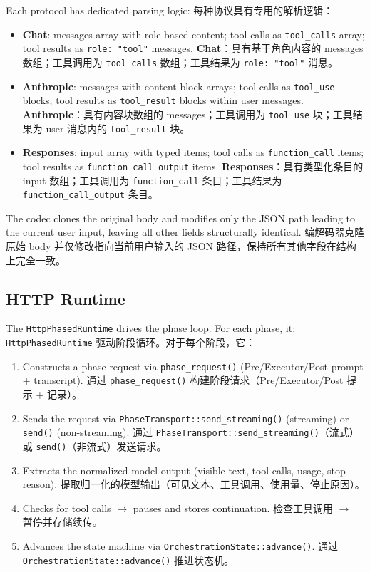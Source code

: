 Each protocol has dedicated parsing logic:
每种协议具有专用的解析逻辑：
\begin{itemize}[nosep]
    \item \textbf{Chat}: messages array with role-based content; tool calls as \texttt{tool\_calls} array; tool results as \texttt{role: "tool"} messages.
    \textbf{Chat}：具有基于角色内容的 messages 数组；工具调用为 \texttt{tool\_calls} 数组；工具结果为 \texttt{role: "tool"} 消息。
    \item \textbf{Anthropic}: messages with content block arrays; tool calls as \texttt{tool\_use} blocks; tool results as \texttt{tool\_result} blocks within user messages.
    \textbf{Anthropic}：具有内容块数组的 messages；工具调用为 \texttt{tool\_use} 块；工具结果为 user 消息内的 \texttt{tool\_result} 块。
    \item \textbf{Responses}: input array with typed items; tool calls as \texttt{function\_call} items; tool results as \texttt{function\_call\_output} items.
    \textbf{Responses}：具有类型化条目的 input 数组；工具调用为 \texttt{function\_call} 条目；工具结果为 \texttt{function\_call\_output} 条目。
\end{itemize}

The codec clones the original body and modifies only the JSON path leading to the current user input, leaving all other fields structurally identical.
编解码器克隆原始 body 并仅修改指向当前用户输入的 JSON 路径，保持所有其他字段在结构上完全一致。

\subsection{HTTP Runtime}

The \texttt{HttpPhasedRuntime} drives the phase loop. For each phase, it:
\texttt{HttpPhasedRuntime} 驱动阶段循环。对于每个阶段，它：
\begin{enumerate}[nosep]
    \item Constructs a phase request via \texttt{phase\_request()} (Pre/Executor/Post prompt + transcript).
    通过 \texttt{phase\_request()} 构建阶段请求（Pre/Executor/Post 提示 + 记录）。
    \item Sends the request via \texttt{PhaseTransport::send\_streaming()} (streaming) or \texttt{send()} (non-streaming).
    通过 \texttt{PhaseTransport::send\_streaming()}（流式）或 \texttt{send()}（非流式）发送请求。
    \item Extracts the normalized model output (visible text, tool calls, usage, stop reason).
    提取归一化的模型输出（可见文本、工具调用、使用量、停止原因）。
    \item Checks for tool calls $\rightarrow$ pauses and stores continuation.
    检查工具调用 $\rightarrow$ 暂停并存储续传。
    \item Advances the state machine via \texttt{OrchestrationState::advance()}.
    通过 \texttt{OrchestrationState::advance()} 推进状态机。
\end{enumerate}


